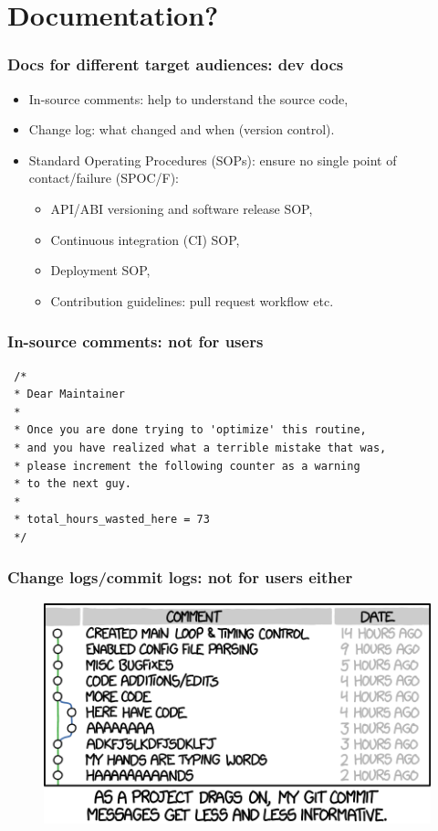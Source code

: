 \section{Documentation?}
\begin{frame}[c]
  \frametitle{Docs for different target audiences: dev docs}
  \begin{itemize}
    \item In-source comments: help to understand the source code,
    \item Change log: what changed and when (version control).
    \item Standard Operating Procedures (SOPs): ensure no single point of contact/failure (SPOC/F):
      \begin{itemize}
        \item API/ABI versioning and software release SOP,
        \item Continuous integration (CI) SOP,
        \item Deployment SOP,
        \item Contribution guidelines: pull request workflow etc.
      \end{itemize}
  \end{itemize}
\end{frame}
\begin{frame}[fragile]
  \frametitle{In-source comments: not for users}
  \begin{verbatim}
 /*
 * Dear Maintainer
 *
 * Once you are done trying to 'optimize' this routine,
 * and you have realized what a terrible mistake that was,
 * please increment the following counter as a warning
 * to the next guy.
 *
 * total_hours_wasted_here = 73
 */
  \end{verbatim}
\end{frame}
\begin{frame}[fragile]
  \frametitle{Change logs/commit logs: not for users either}
  \begin{figure}[h]
    \centering
    \includegraphics[width=0.8\linewidth]{99_images/git_commit}
  \end{figure}
\end{frame}
